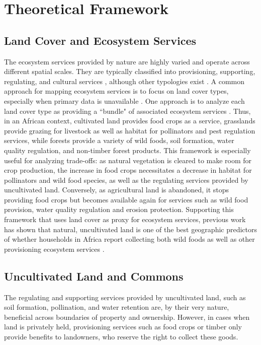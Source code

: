 \documentclass{article}
\begin{document}
\section{Theoretical Framework}

\subsection{Land Cover and Ecosystem Services}
The ecosystem services provided by nature are highly varied and operate across different spatial scales.  They are typically classified into provisioning, supporting, regulating, and cultural services \cite{Martinez-Harms2012}, although other typologies exist \cite{Fisher2008}.  A common approach for mapping ecosystem services is to focus on land cover types, especially when primary data is unavailable \cite{Martinez-Harms2012}.  One approach is to analyze each land cover type as providing a ``bundle" of associated ecosystem services \cite{Raudsepp-Hearne2010}.  Thus, in an African context, cultivated land provides food crops as a service, grasslands provide grazing for livestock as well as habitat for pollinators and pest regulation services, while forests provide a variety of wild foods, soil formation, water quality regulation, and non-timber forest products.  This framework is especially useful for analyzing trade-offs: as natural vegetation is cleared to make room for crop production, the increase in food crops necessitates a decrease in habitat for pollinators and wild food species, as well as the regulating services provided by uncultivated land.  Conversely, as agricultural land is abandoned, it stops providing food crops but becomes available again for services such as wild food provision, water quality regulation and erosion protection.  Supporting this framework that uses land cover as proxy for ecosystem services, previous work has shown that natural, uncultivated land is one of the best geographic predictors of whether households in Africa report collecting both wild foods as well as other provisioning ecosystem services \cite{Cooper2018a}.

\subsection{Uncultivated Land and Commons}
The regulating and supporting services provided by uncultivated land, such as soil formation, pollination, and water retention are, by their very nature, beneficial across boundaries of property and ownership.  However, in cases when land is privately held, provisioning services such as food crops or timber only provide benefits to landowners, who reserve the right to collect these goods.  
\end{document}
